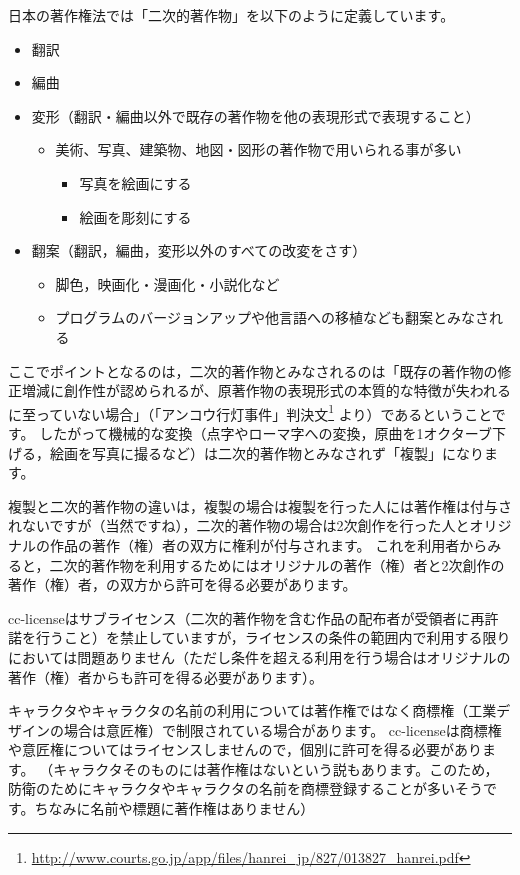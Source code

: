 \documentclass{ltjsarticle}
\begin{document}
日本の著作権法では「二次的著作物」を以下のように定義しています。
\begin{itemize}
\item 翻訳
\item 編曲
\item 変形（翻訳・編曲以外で既存の著作物を他の表現形式で表現すること）
      \begin{itemize}
      \item 美術、写真、建築物、地図・図形の著作物で用いられる事が多い
            \begin{itemize}
            \item 写真を絵画にする
            \item 絵画を彫刻にする
            \end{itemize}
      \end{itemize}
\item 翻案（翻訳，編曲，変形以外のすべての改変をさす）
      \begin{itemize}
      \item 脚色，映画化・漫画化・小説化など
      \item プログラムのバージョンアップや他言語への移植なども翻案とみなされる
      \end{itemize}
\end{itemize}
ここでポイントとなるのは，二次的著作物とみなされるのは「既存の著作物の修正増減に創作性が認められるが、原著作物の表現形式の本質的な特徴が失われるに至っていない場合」（「アンコウ行灯事件」判決文\footnote{\url{http://www.courts.go.jp/app/files/hanrei_jp/827/013827_hanrei.pdf}} より）であるということです。
したがって機械的な変換（点字やローマ字への変換，原曲を1オクターブ下げる，絵画を写真に撮るなど）は二次的著作物とみなされず「複製」になります。

複製と二次的著作物の違いは，複製の場合は複製を行った人には著作権は付与されないですが（当然ですね），二次的著作物の場合は2次創作を行った人とオリジナルの作品の著作（権）者の双方に権利が付与されます。
これを利用者からみると，二次的著作物を利用するためにはオリジナルの著作（権）者と2次創作の著作（権）者，の双方から許可を得る必要があります。

cc-licenseはサブライセンス（二次的著作物を含む作品の配布者が受領者に再許諾を行うこと）を禁止していますが，ライセンスの条件の範囲内で利用する限りにおいては問題ありません（ただし条件を超える利用を行う場合はオリジナルの著作（権）者からも許可を得る必要があります）。

キャラクタやキャラクタの名前の利用については著作権ではなく商標権（工業デザインの場合は意匠権）で制限されている場合があります。
cc-licenseは商標権や意匠権についてはライセンスしませんので，個別に許可を得る必要があります。
（キャラクタそのものには著作権はないという説もあります。このため，防衛のためにキャラクタやキャラクタの名前を商標登録することが多いそうです。ちなみに名前や標題に著作権はありません）
\end{document}
